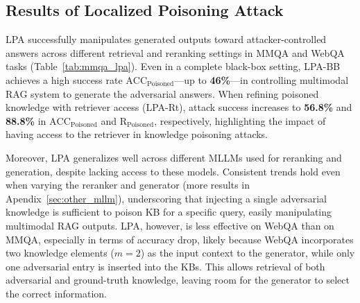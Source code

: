 

\subsection{Results of Localized Poisoning Attack}
LPA successfully manipulates generated outputs toward attacker-controlled answers across different retrieval and reranking settings in MMQA and WebQA tasks (Table~\ref{tab:mmqa_lpa}). Even in a complete black-box setting, LPA-BB achieves a high success rate $\text{ACC}_\text{Poisoned}$---up to \textbf{46\%}---in controlling multimodal RAG system to generate the adversarial answers. When refining poisoned knowledge with retriever access (LPA-Rt), attack success increases to \textbf{56.8\%} and \textbf{88.8\%} in $\text{ACC}_{\text{Poisoned}}$ and $\text{R}_{\text{Poisoned}}$, respectively, highlighting the impact of having access to the retriever in knowledge poisoning attacks.

Moreover, LPA generalizes well across different MLLMs used for reranking and generation, despite lacking access to these models. Consistent trends hold even when varying the reranker and generator (more results in Apendix~\ref{sec:other_mllm}), underscoring that injecting a single adversarial knowledge is sufficient to poison KB for a specific query, easily manipulating multimodal RAG outputs. LPA, however, is less effective on WebQA than on MMQA, especially in terms of accuracy drop, likely because WebQA incorporates two knowledge elements ($m=2$) as the input context to the generator, while only one adversarial entry is inserted into the KBs. This allows retrieval of both adversarial and ground-truth knowledge, leaving room for the generator to select the correct information.




